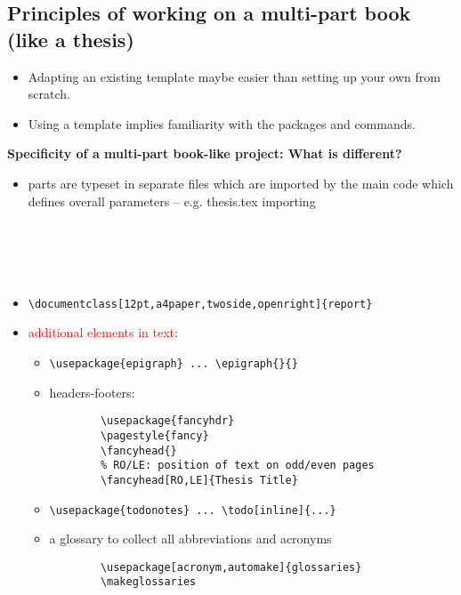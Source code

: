 \documentclass[a4paper,11pt]{article}
\begin{document}
\subsection{Principles of working on a multi-part book (like a thesis)}

\begin{itemize}
	\item Adapting an existing template maybe easier than setting up your own from scratch.
	\item Using a template implies familiarity with the packages and commands.
\end{itemize}

\textbf{Specificity of a multi-part book-like project: What is different?}

\begin{itemize}
	\item parts are typeset in separate files which are imported by the main code which defines overall parameters -- e.g. thesis.tex importing 
	
	\begin{lstlisting}
	 
	
	
	
	\end{lstlisting}
	
	\item \verb|\documentclass[12pt,a4paper,twoside,openright]{report}|
	\item \textcolor{red}{additional elements in text}:
	
	\begin{itemize}
		\item \verb|\usepackage{epigraph} ... \epigraph{}{}|
		\item headers-footers: 
		\begin{lstlisting}
		\usepackage{fancyhdr}
		\pagestyle{fancy}
		\fancyhead{}
		% RO/LE: position of text on odd/even pages
		\fancyhead[RO,LE]{Thesis Title}	
		\end{lstlisting}
		
		\item \verb|\usepackage{todonotes} ... \todo[inline]{...}|
		
		\item a glossary to collect all abbreviations and acronyms 
		\begin{lstlisting}
		\usepackage[acronym,automake]{glossaries}
		\makeglossaries
		\end{lstlisting}
		

\end{itemize}
\end{itemize}
\end{document}
